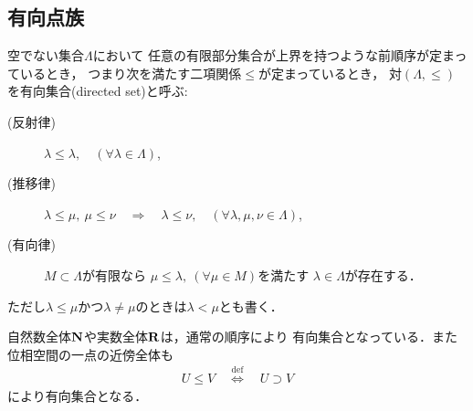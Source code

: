 \subsection{有向点族}
	\begin{screen}
		\begin{dfn}[有向集合]
			空でない集合$\Lambda$において
			任意の有限部分集合が上界を持つような前順序が定まっているとき，
			つまり次を満たす二項関係$\leq$が定まっているとき，
			対$(\Lambda,\leq)$を有向集合(directed set)と呼ぶ:
			\begin{description}
				\item[(反射律)] $\lambda \leq \lambda,\quad (\forall \lambda \in \Lambda)$,
				\item[(推移律)] $\lambda \leq \mu,\ \mu \leq \nu 
					\quad \Longrightarrow \quad \lambda \leq \nu,\quad 
					(\forall \lambda,\mu,\nu \in \Lambda)$,
				\item[(有向律)] 
					$M \subset \Lambda$が有限なら
					$\mu \leq \lambda,\ (\forall \mu \in M)$を満たす
					$\lambda \in \Lambda$が存在する．
			\end{description}
			ただし$\lambda \leq \mu$かつ$\lambda \neq \mu$のときは$\lambda < \mu$とも書く．
		\end{dfn}
	\end{screen}
	自然数全体$\mathbf{N}$や実数全体$\mathbf{R}$は，通常の順序により
	有向集合となっている．また位相空間の一点の近傍全体も
	\begin{align}
		U \leq V \quad \overset{\mathrm{def}}{\Longleftrightarrow} \quad
		U \supset V
	\end{align}
	により有向集合となる．
	
